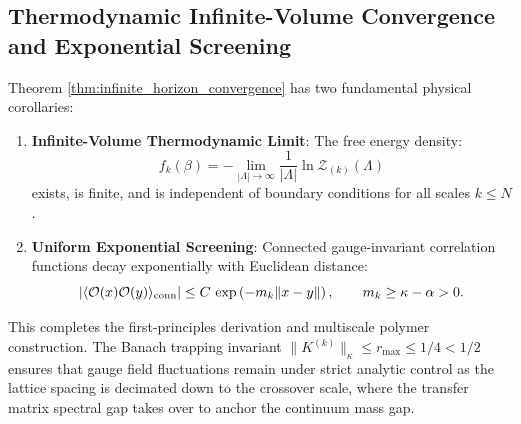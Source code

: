 \subsection{Thermodynamic Infinite-Volume Convergence and Exponential Screening}
\label{subsec:thermo_convergence_screening}

Theorem \ref{thm:infinite_horizon_convergence} has two fundamental physical corollaries:
\begin{enumerate}
    \item \textbf{Infinite-Volume Thermodynamic Limit}: The free energy density:
    \begin{equation}
    f_k(\beta) = -\lim_{|\Lambda| \to \infty} \frac{1}{|\Lambda|} \ln \mathcal{Z}_{(k)}(\Lambda)
    \end{equation}
    exists, is finite, and is independent of boundary conditions for all scales $k \le N$.
    \item \textbf{Uniform Exponential Screening}: Connected gauge-invariant correlation functions decay exponentially with Euclidean distance:
    \begin{equation}
    \left| \langle \mathcal{O}(x) \mathcal{O}(y) \rangle_{\mathrm{conn}} \right| \le C \, \exp\left( -m_k \|x - y\| \right), \qquad m_k \ge \kappa - \alpha > 0.
    \end{equation}
\end{enumerate}

This completes the first-principles derivation and multiscale polymer construction. The Banach trapping invariant $\|K^{(k)}\|_\kappa \le r_{\max} \le 1/4 < 1/2$ ensures that gauge field fluctuations remain under strict analytic control as the lattice spacing is decimated down to the crossover scale, where the transfer matrix spectral gap takes over to anchor the continuum mass gap.